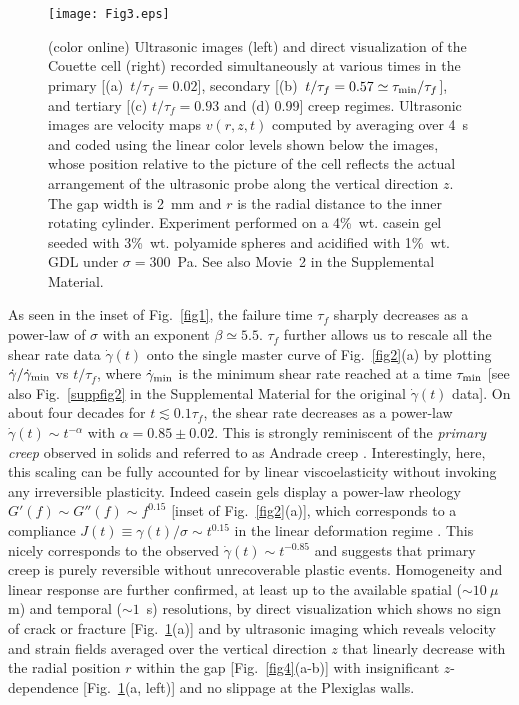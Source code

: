 \documentclass[twocolumn,superscriptaddress,showpacs,preprintnumbers,amsmath,amssymb,prl]{revtex4}
\newcommand\gp{\dot\gamma}
\newcommand\taum{\tau_{\rm min}}
\begin{document}
\begin{figure}[t]
\centering
\texttt{[image: Fig3.eps]}
\caption{(color online) Ultrasonic images (left) and direct visualization of the Couette cell (right) recorded simultaneously at various times in the primary [(a)~$t/\tau_f=0.02$], secondary [(b)~$t/\tau_f=0.57\simeq\taum/\tau_f$], and tertiary  [(c) $t/\tau_f=0.93$ and (d) 0.99] creep regimes. Ultrasonic images are velocity maps $v(r,z,t)$ computed by averaging over 4~s and coded using the linear color levels shown below the images, whose position relative to the picture of the cell reflects the actual arrangement of the ultrasonic probe along the vertical direction $z$. The gap width is 2~mm and $r$ is the radial distance to the inner rotating cylinder. Experiment performed on a 4\%~wt. casein gel seeded with 3\%~wt. polyamide spheres and acidified with 1\%~wt. GDL under $\sigma=300$~Pa. See also Movie~2 in the Supplemental Material.
\label{fig3}}
\end{figure} 

As seen in the inset of Fig.~\ref{fig1}, the failure time $\tau_f$ sharply decreases as a power-law of $\sigma$ with an exponent $\beta\simeq 5.5$. $\tau_f$ further allows us to rescale all the shear rate data $\gp(t)$ onto the single master curve of Fig.~\ref{fig2}(a) by plotting $\gp/\gp_{\rm min}$ vs $t/\tau_f$, where $\gp_{\rm min}$ is the minimum shear rate reached at a time $\tau_{\rm min}$ [see also Fig.~\ref{suppfig2} in the Supplemental Material for the original $\gp(t)$ data]. On about four decades for $t\lesssim 0.1\tau_f$, the shear rate decreases as a power-law $\gp(t)\sim t^{-\alpha}$ with $\alpha=0.85\pm 0.02$. This is strongly reminiscent of the {\it primary creep} observed in solids and referred to as Andrade creep \cite{Andrade:1910,Miguel:2002,Nechad:2005}. Interestingly, here, this scaling can be fully accounted for by linear viscoelasticity without invoking any irreversible plasticity. Indeed casein gels display a power-law rheology $G'(f)\sim G''(f)\sim f^{0.15}$ [inset of Fig.~\ref{fig2}(a)], which corresponds to a compliance $J(t)\equiv\gamma(t)/\sigma\sim t^{0.15}$ in the linear deformation regime \cite{Tschoegl:1989}. This nicely corresponds to the observed $\gp(t)\sim t^{-0.85}$ and suggests that primary creep is purely reversible without unrecoverable plastic events. Homogeneity and linear response are further confirmed, at least up to the available spatial ($\sim 10~\mu$m) and temporal ($\sim 1$~s) resolutions, by direct visualization which shows no sign of crack or fracture [Fig.~\ref{fig3}(a)] and by ultrasonic imaging which reveals velocity and strain fields averaged over the vertical direction $z$ that linearly decrease with the radial position $r$ within the gap [Fig.~\ref{fig4}(a-b)] with insignificant $z$-dependence [Fig.~\ref{fig3}(a, left)] and no slippage at the Plexiglas walls.
\end{document}
